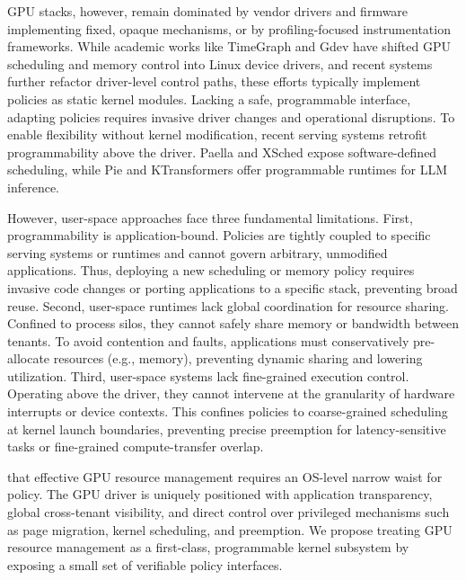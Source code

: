 GPU stacks, however, remain dominated by vendor drivers and firmware implementing fixed, opaque mechanisms, or by profiling-focused instrumentation frameworks\cite{cupti,villa2019nvbit,neutrino,egpu}. 
While academic works like TimeGraph and Gdev have shifted GPU scheduling and memory control into Linux device drivers\cite{timegraph,gdev}, and recent systems further refactor driver-level control paths\cite{kernelintercept,gpreempt,lithos}, these efforts typically implement policies as static kernel modules. Lacking a safe, programmable interface, adapting policies requires invasive driver changes and operational disruptions. To enable flexibility without kernel modification, recent serving systems retrofit programmability above the driver.  Paella\cite{paella} and XSched\cite{xsched} expose software-defined scheduling, while Pie\cite{pie} and KTransformers\cite{ktransformers} offer programmable runtimes for LLM inference. 

However, user-space approaches face three fundamental limitations. First, programmability is application-bound. Policies are tightly coupled to specific serving systems or runtimes and cannot govern arbitrary, unmodified applications. Thus, deploying a new scheduling or memory policy requires invasive code changes or porting applications to a specific stack, preventing broad reuse. Second, user-space runtimes lack global coordination for resource sharing. Confined to process silos, they cannot safely share memory or bandwidth between tenants. To avoid contention and faults, applications must conservatively pre-allocate resources (e.g., memory), preventing dynamic sharing and lowering utilization. Third, user-space systems lack fine-grained execution control. Operating above the driver, they cannot intervene at the granularity of hardware interrupts or device contexts. This confines policies to coarse-grained scheduling at kernel launch boundaries, preventing precise preemption for latency-sensitive tasks or fine-grained compute-transfer overlap.

 that effective GPU resource management requires an OS-level narrow waist for policy. The GPU driver is uniquely positioned with application transparency, global cross-tenant visibility, and direct control over privileged mechanisms such as page migration, kernel scheduling, and preemption. We propose treating GPU resource management as a first-class, programmable kernel subsystem by exposing a small set of verifiable policy interfaces. 


